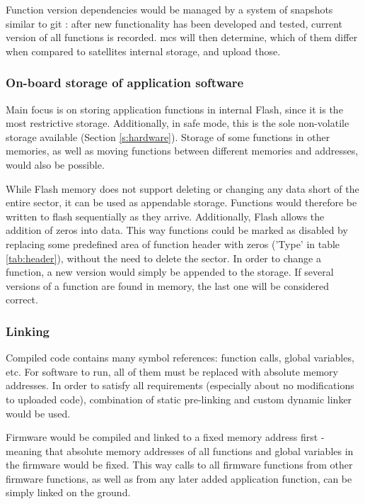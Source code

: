 Function version dependencies would be managed by a system of snapshots similar to git \cite[Chapter~1.3]{Chacon2018}: after new functionality has been developed and tested, current version of all functions is recorded. \Gls{mcs} will then determine, which of them differ when compared to satellites internal storage, and upload those.

\subsubsection{On-board storage of application software}

Main focus is on storing application functions in internal Flash, since it is the most restrictive storage. Additionally, in safe mode, this is the sole non-volatile storage available (Section \ref{s:hardware}). Storage of some functions in other memories, as well as moving functions between different memories and addresses, would also be possible.

While Flash memory does not support deleting or changing any data short of the entire sector, it can be used as appendable storage. Functions would therefore be written to flash sequentially as they arrive. Additionally, Flash allows the addition of zeros into data. This way functions could be marked as disabled by replacing some predefined area of function header with zeros ('Type' in table \ref{tab:header}), without the need to delete the sector. In order to change a function, a new version would simply be appended to the storage. If several versions of a function are found in memory, the last one will be considered correct.

\subsubsection{Linking}

Compiled code contains many symbol references: function calls, global variables, etc. For software to run, all of them must be replaced with absolute memory addresses. In order to satisfy all requirements (especially about no modifications to uploaded code), combination of static pre-linking and custom dynamic linker would be used.

Firmware would be compiled and linked to a fixed memory address first - meaning that absolute memory addresses of all functions and global variables in the firmware would be fixed. This way calls to all firmware functions from other firmware functions, as well as from any later added application function, can be simply linked on the ground.

